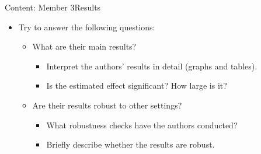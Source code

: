 \documentclass[hyperref={pdfpagelabels=false}]{beamer}
\begin{document}
\begin{frame}{Content: Member 3}{Results}
	\begin{itemize}
		\item Try to answer the following questions:
															\vspace{0.2cm}
		\begin{itemize}
			\item What are their main results?
																\vspace{0.2cm}
			\begin{itemize}
				\item Interpret the authors' results in detail (graphs and tables).
																	\vspace{0.2cm}
				\item Is the estimated effect significant? How large is it?
																	\vspace{0.2cm}
			\end{itemize}
			\item Are their results robust to other settings?
																\vspace{0.2cm}
			\begin{itemize}
				\item What robustness checks have the authors conducted?
																	\vspace{0.2cm}
				\item Briefly describe whether the results are robust.
			\end{itemize}
		\end{itemize}
	\end{itemize}
\end{frame}
\end{document}
